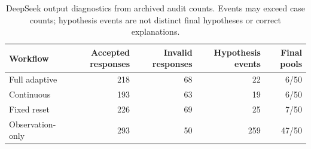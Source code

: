 \begin{table}[t]
\caption{DeepSeek output diagnostics from archived audit counts. Events may exceed case counts; hypothesis events are not distinct final hypotheses or correct explanations.}\label{tab:eval-pilot}
\centering\small
\begin{tabular*}{\textwidth}{@{\extracolsep{\fill}}lrrrr@{}}\toprule
Workflow & Accepted responses & Invalid responses & Hypothesis events & Final pools\\\midrule
Full adaptive & 218 & 68 & 22 & 6/50\\
Continuous & 193 & 63 & 19 & 6/50\\
Fixed reset & 226 & 69 & 25 & 7/50\\
Observation-only & 293 & 50 & 259 & 47/50\\
\bottomrule\end{tabular*}
\end{table}
